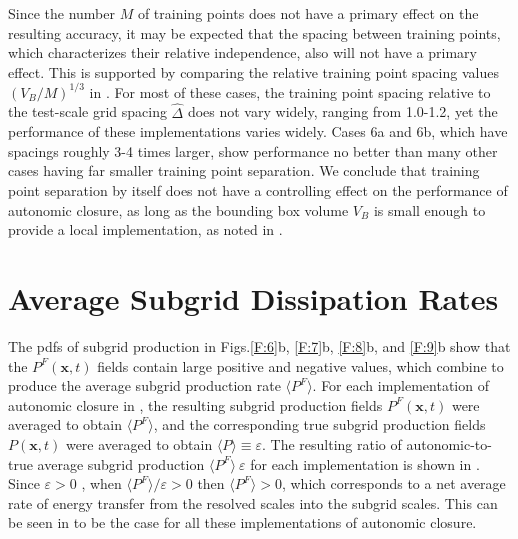 Since the number $M$ of training points does not have a primary effect on the resulting accuracy, it may be expected that the spacing between training points, which characterizes their relative independence, also will not have a primary effect. This is supported by comparing the relative training point spacing values $(V_B/M)^{1/3}$ in . For most of these cases, the training point spacing relative to the test-scale grid spacing $\widehat{\Delta}$  does not vary widely, ranging from 1.0-1.2, yet the performance of these implementations varies widely. Cases 6a and 6b, which have spacings roughly 3-4 times larger, show performance no better than many other cases having far smaller training point separation. We conclude that training point separation by itself does not have a controlling effect on the performance of autonomic closure, as long as the bounding box volume  $V_B$ is small enough to provide a local implementation, as noted in .

\section{Average Subgrid Dissipation Rates}
\label{sec:IVF}

The pdfs of subgrid production in Figs.\ref{F:6}b, \ref{F:7}b, \ref{F:8}b, and \ref{F:9}b show that the $P^F(\mathbf{x},t)$  fields contain large positive and negative values, which combine to produce the average subgrid production rate $\langle P^F \rangle$. For each implementation of autonomic closure in , the resulting  subgrid production fields $P^F(\mathbf{x},t)$  were averaged to obtain $\langle P^F \rangle$, and the corresponding true subgrid production fields $P(\mathbf{x},t)$   were averaged to obtain $\langle P \rangle \equiv \varepsilon$. The resulting ratio of autonomic-to-true average subgrid production $\langle P^F \rangle\ \varepsilon$  for each implementation is shown in . Since $\varepsilon > 0$ , when  $\langle P^F\rangle/ \varepsilon > 0$  then $\langle P^F \rangle > 0$, which corresponds to a net average rate of energy transfer from the resolved scales into the subgrid scales.  This can be seen in  to be the case for all these implementations of autonomic closure. 


